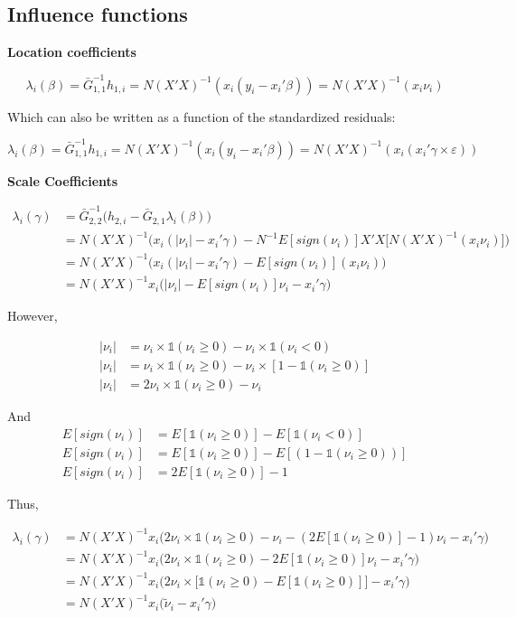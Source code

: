 \documentclass[
  authoryear,
  review,
  1p]{elsarticle}
\begin{document}
\subsection{Influence functions}\label{influence-functions}

\textbf{Location coefficients}

\[\lambda_i(\beta) = \bar G^{-1}_{1,1} h_{1,i} = N (X'X)^{-1}(x_i (y_i-x_i'\beta)) = N (X'X)^{-1}(x_i \nu_i)
\]

Which can also be written as a function of the standardized residuals:

\[\lambda_i(\beta) = \bar G^{-1}_{1,1} h_{1,i} = N (X'X)^{-1}(x_i (y_i-x_i'\beta)) = N (X'X)^{-1}(x_i ( x_i'\gamma \times \varepsilon))
\]

\textbf{Scale Coefficients}

\[\begin{aligned}
\lambda_i(\gamma)&=\bar G_{2,2}^{-1}\Big(h_{2,i}-\bar G_{2,1} \lambda_i(\beta)\Big) \\
&=N (X'X)^{-1} \Big(x_i(|\nu_i|-x_i' \gamma) 
- N^{-1} E[sign(\nu_i)] X'X \big[ N (X'X)^{-1}(x_i \nu_i) \big] \Big) \\
&=N (X'X)^{-1} \Big(x_i(|\nu_i|-x_i' \gamma) - E[sign(\nu_i)] (x_i \nu_i)  \Big) \\
&=N (X'X)^{-1} x_i \Big( |\nu_i| - E[sign(\nu_i)] \nu_i -x_i' \gamma \Big) 
\end{aligned}
\]

However,

\[\begin{aligned}
|\nu_i| &= \nu_i \times \mathbb{1}(\nu_i \geq 0) - \nu_i \times \mathbb{1}(\nu_i < 0) \\
|\nu_i| &= \nu_i \times \mathbb{1}(\nu_i \geq 0) - \nu_i \times [1-\mathbb{1}(\nu_i \geq 0)] \\
|\nu_i| &= 2 \nu_i \times \mathbb{1}(\nu_i \geq 0) - \nu_i  
\end{aligned}
\]

And \[\begin{aligned}
E[sign(\nu_i)] &= E[\mathbb{1}(\nu_i \geq 0)] - E[\mathbb{1}(\nu_i < 0)] \\
E[sign(\nu_i)] &= E[\mathbb{1}(\nu_i \geq 0)] - E[(1-\mathbb{1}(\nu_i \geq 0))] \\
E[sign(\nu_i)] &= 2 E[\mathbb{1}(\nu_i \geq 0)] - 1
\end{aligned}
\]

Thus,

\[\begin{aligned}
\lambda_i(\gamma) &= N(X'X)^{-1} x_i   \Big( 2 \nu_i \times \mathbb{1}(\nu_i \geq 0) - \nu_i  - ( 2 E[\mathbb{1}(\nu_i \geq 0)] - 1) \nu_i -x_i' \gamma \Big) \\
  &= N(X'X)^{-1} x_i   \Big( 2 \nu_i \times \mathbb{1}(\nu_i \geq 0) -  2 E[\mathbb{1}(\nu_i \geq 0)] \nu_i -x_i' \gamma \Big) \\
  &= N(X'X)^{-1} x_i   \Big( 2 \nu_i \times \big[ \mathbb{1}(\nu_i \geq 0) -  E[\mathbb{1}(\nu_i \geq 0)] \big] -x_i'\gamma \Big) \\
  &= N(X'X)^{-1} x_i   \Big( \tilde \nu_i -x_i' 
  \gamma \Big)
\end{aligned}
\]
\end{document}
